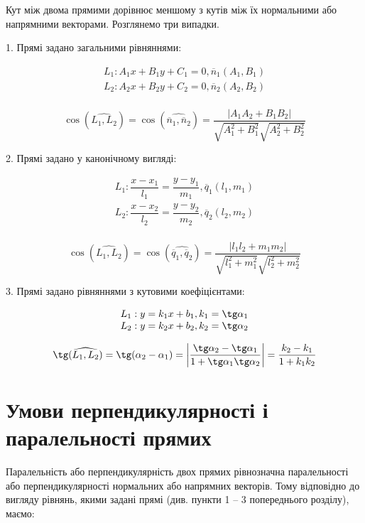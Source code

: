 Кут між двома прямими дорівнює меншому з кутів між їх нормальними або
напрямними векторами. Розглянемо три випадки.

1. Прямі задано загальними рівняннями:

$$\begin{array}{l}
	L_1: A_1x + B_1y + C_1 = 0, \overline{n}_1(A_1,B_1) \\
	L_2: A_2x + B_2y + C_2 = 0, \overline{n}_2(A_2,B_2) \\
\end{array}$$

$$\cos(\widehat{L_1,L_2}) = \cos(\widehat{\overline{n}_1, \overline{n}_2}) = \dfrac{|A_1A_2 + B_1B_2|}{\sqrt{A_1^2+ B_1^2}\sqrt{A_2^2+ B_2^2}}$$

2. Прямі задано у канонічному вигляді:

$$\begin{array}{l}
	L_1: \dfrac{x - x_1}{l_1} = \dfrac{y - y_1}{m_1}, \overline{q}_1(l_1,m_1) \\
	L_2: \dfrac{x - x_2}{l_2} = \dfrac{y - y_2}{m_2}, \overline{q}_2(l_2,m_2) \\
\end{array}$$

$$\cos(\widehat{L_1,L_2}) = \cos(\widehat{\overline{q}_1, \overline{q}_2}) = \dfrac{|l_1l_2 + m_1m_2|}{\sqrt{l_1^2+ m_1^2}\sqrt{l_2^2+ m_2^2}}$$

3. Прямі задано рівняннями з кутовими коефіцієнтами: 

$$\begin{array}{l}
	L_1: y = k_1x + b_1, k_1 = \tg\alpha_1 \\
	L_2: y = k_2x + b_2, k_2 = \tg\alpha_2 \\
\end{array}$$

$$\tg(\widehat{L_1,L_2}) = \tg(\alpha_2 - \alpha_1) = \left|\dfrac{\tg\alpha_2 - \tg\alpha_1}{1+\tg\alpha_1\tg\alpha_2}\right| = \dfrac{k_2 - k_1}{1+k_1k_2}$$

\parbox{\textwidth - 0.6cm}{\section{Умови перпендикулярності і паралельності прямих}}

Паралельність або перпендикулярність двох прямих рівнозначна
паралельності або перпендикулярності нормальних або напрямних векторів. Тому
відповідно до вигляду рівнянь, якими задані прямі (див. пункти 1 – 3 попереднього
розділу), маємо:

